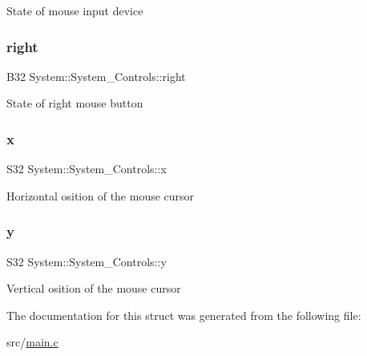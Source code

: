 State of mouse input device \mbox{\label{structSystem_1_1System__Controls_aaf03eca483805c57b9db6eadfa408f1d}} 
\subsubsection{\texorpdfstring{right}{right}}
{\footnotesize\ttfamily B32 System\+::\+System\+\_\+\+Controls\+::right}

State of right mouse button \mbox{\label{structSystem_1_1System__Controls_a2b0baa944b0039ebccdca209f164dc0b}} 
\subsubsection{\texorpdfstring{x}{x}}
{\footnotesize\ttfamily S32 System\+::\+System\+\_\+\+Controls\+::x}

Horizontal osition of the mouse cursor \mbox{\label{structSystem_1_1System__Controls_a10ceb04c7a87178af40e43cccf2d64c5}} 
\subsubsection{\texorpdfstring{y}{y}}
{\footnotesize\ttfamily S32 System\+::\+System\+\_\+\+Controls\+::y}

Vertical osition of the mouse cursor 

The documentation for this struct was generated from the following file\+:\begin{DoxyCompactItemize}
\item 
src/\mbox{\hyperlink{main_8c}{main.\+c}}\end{DoxyCompactItemize}
